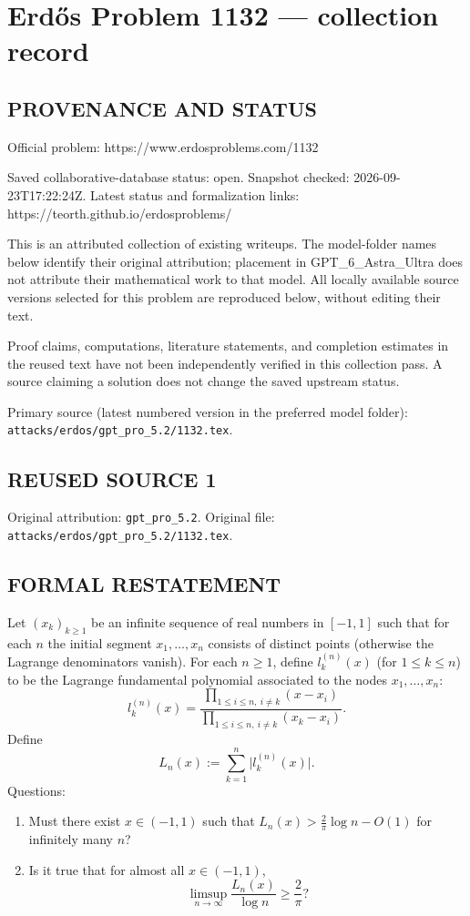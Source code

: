 \section*{Erd\H{o}s Problem 1132 --- collection record}

\subsection*{PROVENANCE AND STATUS}
Official problem: https://www.erdosproblems.com/1132

Saved collaborative-database status: open.
Snapshot checked: 2026-09-23T17:22:24Z.
Latest status and formalization links: https://teorth.github.io/erdosproblems/

This is an attributed collection of existing writeups. The model-folder names below identify their original attribution; placement in GPT\_6\_Astra\_Ultra does not attribute their mathematical work to that model. All locally available source versions selected for this problem are reproduced below, without editing their text.

Proof claims, computations, literature statements, and completion estimates in the reused text have not been independently verified in this collection pass. A source claiming a solution does not change the saved upstream status.

Primary source (latest numbered version in the preferred model folder): \texttt{attacks/erdos/gpt\_pro\_5.2/1132.tex}.

\subsection*{REUSED SOURCE 1}
Original attribution: \texttt{gpt\_pro\_5.2}.
Original file: \texttt{attacks/erdos/gpt\_pro\_5.2/1132.tex}.


\subsection*{FORMAL RESTATEMENT}
Let $(x_k)_{k\ge 1}$ be an infinite sequence of real numbers in $[-1,1]$ such that for each $n$ the initial segment $x_1,\dots,x_n$ consists of distinct points (otherwise the Lagrange denominators vanish).
For each $n\ge 1$, define $l_k^{(n)}(x)$ (for $1\le k\le n$) to be the Lagrange fundamental polynomial associated to the nodes $x_1,\dots,x_n$:
\[
 l_k^{(n)}(x)=\frac{\prod_{1\le i\le n,\ i\ne k}(x-x_i)}{\prod_{1\le i\le n,\ i\ne k}(x_k-x_i)}.
\]
Define
\[
L_n(x):=\sum_{k=1}^n \bigl|l_k^{(n)}(x)\bigr|.
\]
Questions:
\begin{enumerate}
\item Must there exist $x\in(-1,1)$ such that $L_n(x) > \tfrac{2}{\pi}\log n - O(1)$ for infinitely many $n$?
\item Is it true that for almost all $x\in(-1,1)$,
\[\limsup_{n\to\infty} \frac{L_n(x)}{\log n}\ge \frac{2}{\pi}?\]
\end{enumerate}

